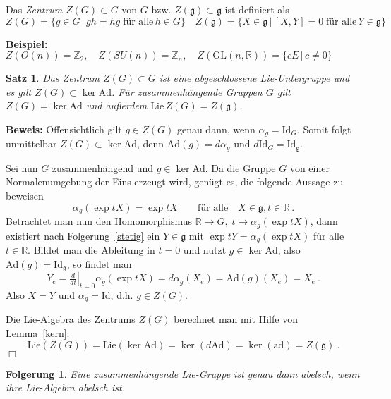 \documentclass[12pt,a4paper]{article}
\def\R{\mathbb{R}}
\def\Z{\mathbb{Z}}
\def\GL{\mathrm{GL}}
\def\Ad{\mathrm{Ad}}
\def\ad{\mathrm{ad}}
\def\Lie{\mathrm{Lie}}
\def\g{\mathfrak{g}}
\def\ad{\mathrm{ad}}
\def\Id{\mathrm{Id}}
\newtheorem{Satz}[Lemma]{Satz}
\newtheorem{Folgerung}[Lemma]{Folgerung}
\def\proof{\noindent\textbf{Beweis:}\quad}
\def\qed{\quad\hfill\ensuremath{\Box}}
\begin{document}
\bigskip

Das {\it Zentrum} $Z(G) \subset G $ von $G$ bzw. $Z(\g) \subset \g$ ist definiert als
$$
Z(G) = \{ g \in G \,|\, gh = hg \; \mbox{f\"ur alle} \,  h \in G\}
\quad
Z(\g) = \{ X \in \g \,|\, [X,Y]=0 \; \mbox{f\"ur alle}  \,Y \in \g\}
$$

\bigskip

{\bf Beispiel:}
$
Z(O(n)) = \Z_2,\quad Z(SU(n))= \Z_n, \quad Z(\GL(n,\R)) = \{ c E \,|\, c \neq 0\}
$

\bigskip

\begin{Satz}
Das Zentrum $Z(G)\subset G$ ist eine abgeschlossene Lie-Untergruppe und es gilt
$Z(G) \subset \ker \Ad$. F\"ur zusammenh\"angende Gruppen $G$ gilt
$Z(G) = \ker \Ad$ und au\ss erdem $\Lie \, Z(G) = Z(\g)$.
\end{Satz}
\proof
Offensichtlich gilt $g\in Z(G)$ genau dann, wenn $\alpha_g = \Id_G$. Somit
folgt unmittelbar $Z(G) \subset \ker \Ad$, denn $\Ad(g) = d\alpha_g$ und
$d\Id_G= \Id_\g$.

\medskip

Sei nun $G$ zusammenh\"angend und $g\in \ker \Ad$. Da die Gruppe $G$ von einer
Normalenumgebung der Eins erzeugt wird, gen\"ugt es, die folgende Aussage zu
beweisen
$$
\alpha_g(\exp tX) = \exp tX \qquad \mbox{f\"ur alle}\quad X\in \g, t \in \R \ .
$$
Betrachtet man nun den Homomorphismus $\R\rightarrow G, \;t\mapsto \alpha_g(\exp tX)$,
dann existiert nach Folgerung~\ref{stetig} ein $Y\in \g$ mit
$\exp tY = \alpha_g(\exp tX)$ f\"ur alle $t\in \R$. Bildet man die Ableitung
in $t=0$ und nutzt $g \in \ker \Ad$, also $\Ad(g) = \Id_\g$, so findet man
$$
Y_e = \left. \tfrac{d}{dt}\right|_{t=0} \alpha_g(\exp tX) = d\alpha_g(X_e) = \Ad(g)(X_e)=X_e \ .
$$
Also $X=Y$ und $\alpha_g= \Id$, d.h. $g\in Z(G)$.

\medskip

Die Lie-Algebra des Zentrums $Z(G)$ berechnet man mit Hilfe von Lemma~\ref{kern}:
$$
\Lie(Z(G))=\Lie(\ker \Ad) = \ker(d\Ad) = \ker(\ad) = Z(\g) \ .
$$
\qed

\bigskip

\begin{Folgerung}
Eine zusammenh\"angende Lie-Gruppe ist genau dann abelsch, wenn ihre Lie-Algebra abelsch ist.
\end{Folgerung}
\end{document}
